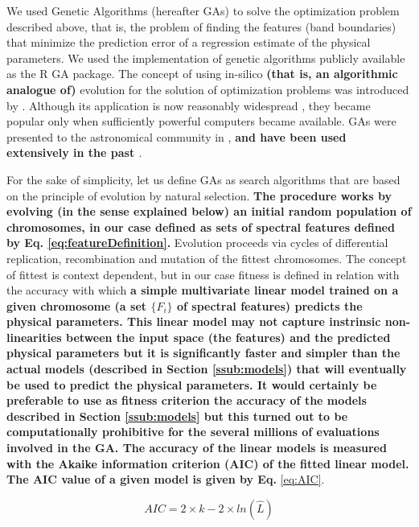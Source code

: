 We used Genetic Algorithms (hereafter GAs) to solve the optimization
problem described above, that is, the problem of finding the features
(band boundaries) that minimize the prediction error of a regression
estimate of the physical parameters. We used the implementation of
genetic algorithms publicly available as the R \citep{R2013} GA
package. The concept of using in-silico {\bf (that is, an algorithmic
analogue of)} evolution for the solution of optimization problems was
introduced by \cite{holland1975adaptation}. Although its application
is now reasonably widespread \citep[see e.g.][]{goldberg1989genetic},
they became popular only when sufficiently powerful computers became
available. GAs were presented to the astronomical community
in \cite{1995ApJS..101..309C}, {\bf and have been used extensively in
the past \citep[see][for a significant application of GAs in
astronomy]{2013A&A...550A..74D}}.

For the sake of simplicity, let us define GAs as search algorithms
that are based on the principle of evolution by natural
selection. {\bf The procedure works by evolving (in the sense
explained below) an initial random population of chromosomes, in our
case defined as sets of spectral features defined by
Eq. \ref{eq:featureDefinition}.}  Evolution proceeds via cycles of
differential replication, recombination and mutation of the fittest
chromosomes. The concept of fittest is context dependent, but in our
case fitness is defined in relation with the accuracy with which
\textbf{a simple multivariate linear model trained on a given chromosome (a
set $\{F_i\}$ of spectral features) predicts the physical
parameters. This linear model may not capture instrinsic
non-linearities between the input space (the features) and the
predicted physical parameters but it is significantly faster and
simpler than the actual models (described in
Section \ref{ssub:models}) that will eventually be used to predict the
physical parameters. It would certainly be preferable to use as
fitness criterion the accuracy of the models described in
Section \ref{ssub:models} but this turned out to be computationally
prohibitive for the several millions of evaluations involved in the
GA. The accuracy of the linear models is measured with the Akaike
information criterion (AIC) of the fitted linear model.  The AIC value
of a given model is given by Eq.} \ref{eq:AIC}.

\begin{equation}\label{eq:AIC}
  AIC = 2 \times k - 2 \times ln(\hat{L}) 
\end{equation}

